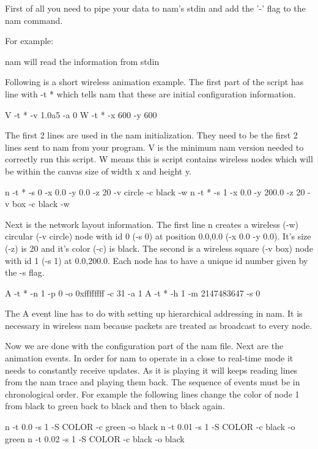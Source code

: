 First of all you need to pipe your data to nam's stdin and add the '-'
flag to the nam command.

For example:

\begin{program}
\end{program}

nam will read the information from stdin

Following is a short wireless animation example.  The first part of the
script has line with -t * which tells nam that these are initial
configuration information.

\begin{program}
V -t * -v 1.0a5 -a 0
W -t * -x 600 -y 600
\end{program}

The first 2 lines are used in the nam initialization.  They need to be
the first 2 lines sent to nam from your program. V is the minimum nam
version needed to correctly run this script.  W means this is script
contains wireless nodes which will be within the canvas size of width x
and height y.

\begin{program}
n -t * -s 0 -x 0.0 -y 0.0 -z 20 -v circle -c black -w
n -t * -s 1 -x 0.0 -y 200.0 -z 20 -v box -c black -w
\end{program}

Next is the network layout information.  The first line n creates a
wireless (-w) circular (-v circle) node with id 0 (-s 0) at position
0.0,0.0 (-x 0.0 -y 0.0). It's size (-z) is 20 and it's color (-c) is
black.  The second is a wireless square (-v box) node with id 1 (-s 1)
at 0.0,200.0.  Each node has to have a unique id number given by the -s
flag.

\begin{program}
A -t * -n 1 -p 0 -o 0xffffffff -c 31 -a 1
A -t * -h 1 -m 2147483647 -s 0
\end{program}

The A event line has to do with setting up hierarchical addressing in
nam.  It is necessary in wireless nam because packets are treated as
broadcast to every node.

Now we are done with the configuration part of the nam file.  Next are
the animation events.  In order for nam to operate in a close to
real-time mode it needs to constantly receive updates.  As it is playing
it will  keeps reading lines from the nam trace and playing them back.
The sequence of events must be in chronological order.  For example the
following lines change the color of node 1 from black to green back to
black and then to black again.
\begin{program}
n -t 0.0 -s 1 -S COLOR -c green -o black
n -t 0.01 -s 1 -S COLOR -c black -o green
n -t 0.02 -s 1 -S COLOR -c black -o black
\end{program}

